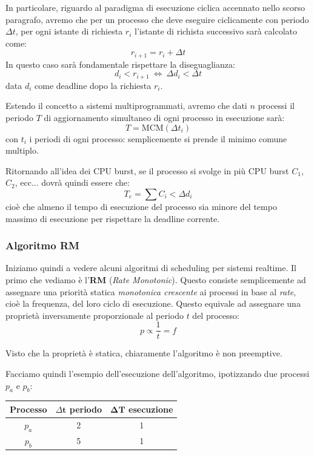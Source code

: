 \documentclass[a4paper,11pt]{article}
\begin{document}
In particolare, riguardo al paradigma di esecuzione ciclica accennato nello scorso paragrafo, avremo che per un processo che deve eseguire ciclicamente con periodo $\Delta t$, per ogni istante di richiesta $r_i$ l'istante di richista successivo sarà calcolato come:
$$
r_{i + 1} = r_i + \Delta t
$$
In questo caso sarà fondamentale rispettare la diseguaglianza:
$$
d_i < r_{i + 1} \ \Leftrightarrow \ \Delta d_i < \Delta t
$$
data $d_i$ come deadline dopo la richiesta $r_i$.

Estendo il concetto a sistemi multiprogrammati, avremo che dati $n$ processi il periodo $T$ di aggiornamento simultaneo di ogni processo in esecuzione sarà:
$$
T = \text{MCM}\left(\Delta t_i\right)
$$
con $t_i$ i periodi di ogni processo: semplicemente si prende il minimo comune multiplo.

\par\smallskip

Ritornando all'idea dei CPU burst, se il processo si svolge in più CPU burst $C_1$, $C_2$, ecc... dovrà quindi essere che:
$$
T_e = \sum C_i < \Delta d_i
$$
cioè che almeno il tempo di esecuzione del processo sia minore del tempo massimo di esecuzione per rispettare la deadline corrente.

\subsubsection{Algoritmo RM}
Iniziamo quindi a vedere alcuni algoritmi di scheduling per sistemi realtime.
Il primo che vediamo è l'\textbf{RM} (\textit{Rate Monotonic}).
Questo consiste semplicemente ad assegnare una priorità statica \textit{monotonica crescente} ai processi in base al \textit{rate}, cioè la frequenza, del loro ciclo di esecuzione.
Questo equivale ad assegnare una proprietà inversamente proporzionale al periodo $t$ del processo:
$$
p \propto \frac{1}{t} = f
$$

Visto che la proprietà è statica, chiaramente l'algoritmo è non preemptive.

\par\smallskip

Facciamo quindi l'esempio dell'esecuzione dell'algoritmo, ipotizzando due processi $p_a$ e $p_b$:
\begin{table}[H]
	\center {}
	\begin{tabular} { c || c | c }
		\bfseries Processo & \bfseries $\Delta \mathbf{t}$ periodo & \bfseries $\mathbf{\Delta T}$ esecuzione \\
		\hline
		$p_a$ & 2 & 1 \\ 
		$p_b$ & 5 & 1
	\end{tabular}
\end{table}
\end{document}
